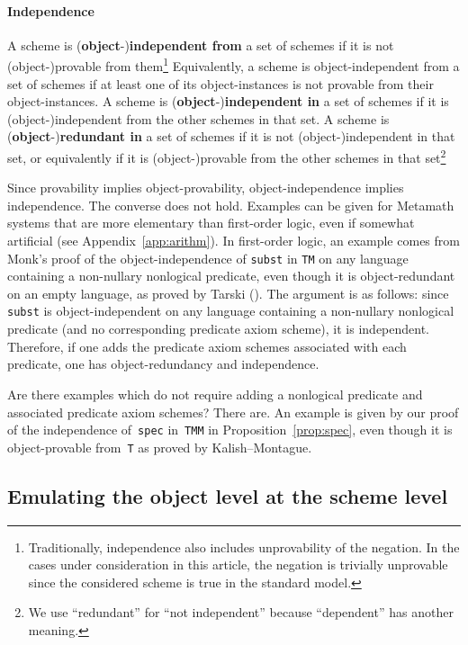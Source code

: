 \documentclass[11pt]{article}
\newcommand*{\define}[1]{\textbf{#1}}%
\theoremstyle{plain}
\theoremstyle{definition}
\theoremstyle{remark}
\begin{document}
\paragraph{Independence}

A scheme is (\define{object}-)\define{independent from} a set of schemes if it is not (object-)provable
from them\footnote{
Traditionally, independence also includes unprovability of the negation. In the cases under
consideration in this article, the negation is trivially unprovable since the considered scheme is
true in the standard model.}
Equivalently, a scheme is object-independent from a set of schemes if at least one of its
object-instances is not provable from their object-instances.
A scheme is (\define{object}-)\define{independent in} a set of schemes if it is (object-)independent
from the other schemes in that set.
A scheme is (\define{object}\nobreakdash-)\define{redundant in} a set of schemes if it is not
(object\nobreakdash-)independent
in that set, or equivalently if it is (object-)provable from the other schemes in that
set\footnote{
We use ``redundant'' for ``not independent'' because ``dependent'' has another meaning.}

Since provability implies object-provability, object-independence implies independence.
The converse does not hold.
Examples can be given for Metamath systems that are more elementary than first-order logic, even if
somewhat artificial (see Appendix~\ref{app:arithm}).
In first-order logic, an example comes from Monk's proof of the object-independence of \texttt{subst}
in \texttt{TM} on any language containing a non-nullary nonlogical predicate, even though it is
object-redundant on an empty language, as proved by Tarski (\cite[Lem.~13 and~16]{tarski}).
The argument is as follows: since \texttt{subst} is object-independent on any language containing a
non-nullary nonlogical predicate (and no corresponding predicate axiom scheme), it is independent.
Therefore, if one adds the predicate axiom schemes associated with each predicate, one has
object-redundancy and independence.

Are there examples which do not require adding a nonlogical predicate and associated predicate
axiom schemes?
There are.
An example is given by our proof of the independence of~\texttt{spec} in~\texttt{TMM} in
Proposition~\ref{prop:spec}, even though it is object-provable from~\texttt{T} as proved by
Kalish--Montague.



\subsection{Emulating the object level at the scheme level}
\label{subsec:emulating}
\end{document}
